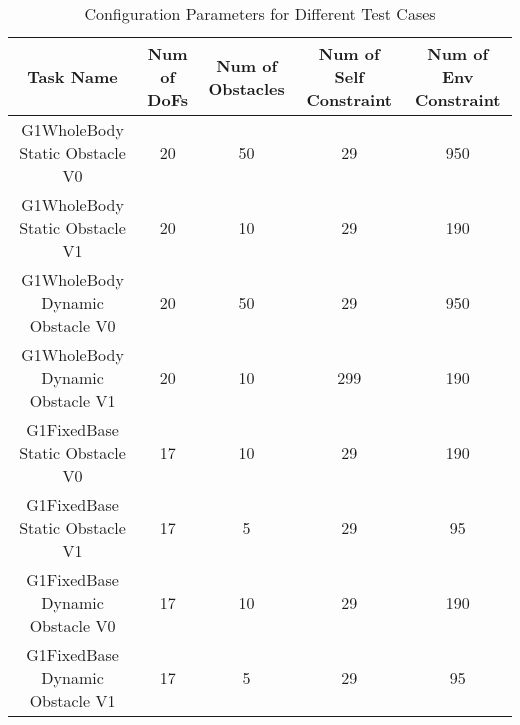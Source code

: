 \begin{table}[htbp]
\centering
\captionsetup{width=0.95\textwidth}
\caption{Configuration Parameters for Different Test Cases}
\label{tab:config_parameters}

\begin{tabular}{ccccc}
\toprule
\textbf{Task Name} & \textbf{Num of DoFs} & \textbf{Num of Obstacles} & \textbf{Num of Self Constraint} & \textbf{Num of Env Constraint} \\
\midrule
G1WholeBody Static Obstacle V0 & 20 & 50 & 29 & 950 \\
G1WholeBody Static Obstacle V1 & 20 & 10 & 29 & 190 \\
G1WholeBody Dynamic Obstacle V0 & 20 & 50 & 29 & 950\\
G1WholeBody Dynamic Obstacle V1 & 20 & 10 & 299 & 190 \\
G1FixedBase Static Obstacle V0 & 17 & 10 & 29 & 190\\
G1FixedBase Static Obstacle V1 & 17 & 5 & 29 & 95 \\
G1FixedBase Dynamic Obstacle V0 & 17 & 10 & 29 & 190\\
G1FixedBase Dynamic Obstacle V1 & 17 & 5 & 29 & 95\\
\bottomrule
\end{tabular}

\end{table}